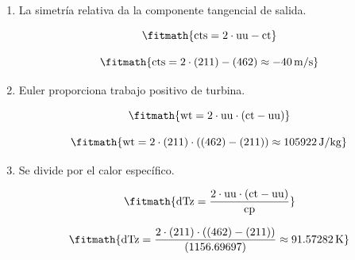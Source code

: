 \begin{enumerate}

\item La simetría relativa da la componente tangencial de salida.

\[\fitmath{\mathrm{cts}=2\cdot \mathrm{uu}-\mathrm{ct}}\]

\[\fitmath{\mathrm{cts}=2\cdot (211)-(462)\approx -40\,\mathrm{m/s}}\]

\item Euler proporciona trabajo positivo de turbina.

\[\fitmath{\mathrm{wt}=2\cdot \mathrm{uu}\cdot \left(\mathrm{ct}-\mathrm{uu}\right)}\]

\[\fitmath{\mathrm{wt}=2\cdot (211)\cdot \left((462)-(211)\right)\approx 105922\,\mathrm{J/kg}}\]

\item Se divide por el calor específico.

\[\fitmath{\mathrm{dTz}=\frac{2\cdot \mathrm{uu}\cdot \left(\mathrm{ct}-\mathrm{uu}\right)}{\mathrm{cp}}}\]

\[\fitmath{\mathrm{dTz}=\frac{2\cdot (211)\cdot \left((462)-(211)\right)}{(1156.69697)}\approx 91.57282\,\mathrm{K}}\]

\end{enumerate}
